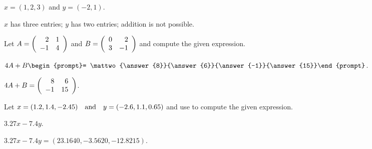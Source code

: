 \documentclass{ximera}
\begin{document}
\begin{exercise}\label{c1.1.3c}
  $x=(1,2,3)$ and $y=(-2,1)$.
  
  \begin{multipleChoice}
  \end{multipleChoice}  

\begin{solution}
$x$ has three entries; $y$ has two entries; addition is not possible.

\end{solution}
\end{exercise}





\problemlabel

\noindent Let $A=\left(\begin{array}{rr} 2 & 1\\ -1 &4\end{array}\right)$ and $B=\left(\begin{array}{rr} 0 & 2\\ 3 &-1\end{array}\right)$ and compute the given  expression.

\begin{exercise}\label{c1.1.4A}
  $4A+B\begin{prompt}= \mattwo{\answer{8}}{\answer{6}}{\answer{-1}}{\answer{15}}\end{prompt}$.

\begin{solution}
$4A + B = \left(\begin{array}{rr} 8 & 6\\ -1 &15\end{array}\right)$.


\end{solution}
\end{exercise}





\matlabproblemlabel

\noindent Let  $x=(1.2,1.4,-2.45) \quad\mbox{and}\quad y=(-2.6,1.1,0.65)$ and use \Matlab to compute the  given expression.

\begin{computerExercise}  \label{c1.2.3a}
$3.27x-7.4y$.

\begin{solution}
$3.27x - 7.4y = (23.1640, -3.5620, -12.8215)$.

\end{solution}
\end{computerExercise}


\end{document}
